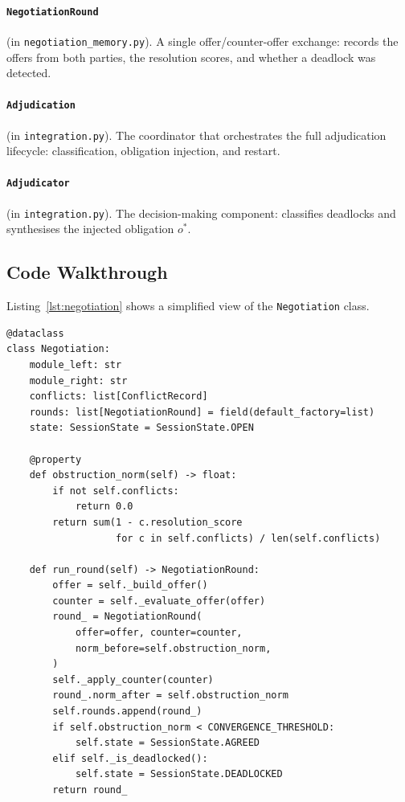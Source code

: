 \documentclass[11pt]{article}
\begin{document}
\paragraph{\texttt{NegotiationRound}} (in \texttt{negotiation\_memory.py}).
A single offer/counter-offer exchange: records the offers from both
parties, the resolution scores, and whether a deadlock was detected.

\paragraph{\texttt{Adjudication}} (in \texttt{integration.py}).
The coordinator that orchestrates the full adjudication lifecycle:
classification, obligation injection, and restart.

\paragraph{\texttt{Adjudicator}} (in \texttt{integration.py}).
The decision-making component: classifies deadlocks and synthesises
the injected obligation $o^*$.

\subsection{Code Walkthrough}

Listing~\ref{lst:negotiation} shows a simplified view of the
\texttt{Negotiation} class.

\begin{lstlisting}[style=jugeo-python,caption={Simplified \texttt{Negotiation} class.},label={lst:negotiation}]
@dataclass
class Negotiation:
    module_left: str
    module_right: str
    conflicts: list[ConflictRecord]
    rounds: list[NegotiationRound] = field(default_factory=list)
    state: SessionState = SessionState.OPEN

    @property
    def obstruction_norm(self) -> float:
        if not self.conflicts:
            return 0.0
        return sum(1 - c.resolution_score
                   for c in self.conflicts) / len(self.conflicts)

    def run_round(self) -> NegotiationRound:
        offer = self._build_offer()
        counter = self._evaluate_offer(offer)
        round_ = NegotiationRound(
            offer=offer, counter=counter,
            norm_before=self.obstruction_norm,
        )
        self._apply_counter(counter)
        round_.norm_after = self.obstruction_norm
        self.rounds.append(round_)
        if self.obstruction_norm < CONVERGENCE_THRESHOLD:
            self.state = SessionState.AGREED
        elif self._is_deadlocked():
            self.state = SessionState.DEADLOCKED
        return round_
\end{lstlisting}
\end{document}
